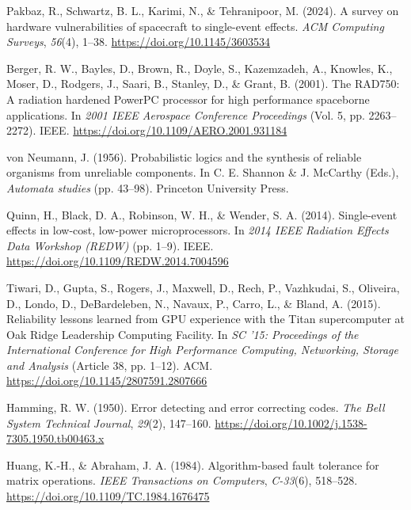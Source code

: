 \documentclass[12pt,a4paper]{article}
\theoremstyle{plain}
\theoremstyle{definition}
\begin{document}
\begin{enumerate}[label={[\arabic*]}, leftmargin=2em, itemsep=4pt]

\item Pakbaz, R., Schwartz, B. L., Karimi, N., \& Tehranipoor, M. (2024). A survey on hardware vulnerabilities of spacecraft to single-event effects. \textit{ACM Computing Surveys}, \textit{56}(4), 1--38. \url{https://doi.org/10.1145/3603534}

\item Berger, R. W., Bayles, D., Brown, R., Doyle, S., Kazemzadeh, A., Knowles, K., Moser, D., Rodgers, J., Saari, B., Stanley, D., \& Grant, B. (2001). The RAD750: A radiation hardened PowerPC processor for high performance spaceborne applications. In \textit{2001 IEEE Aerospace Conference Proceedings} (Vol. 5, pp. 2263--2272). IEEE. \url{https://doi.org/10.1109/AERO.2001.931184}

\item von Neumann, J. (1956). Probabilistic logics and the synthesis of reliable organisms from unreliable components. In C. E. Shannon \& J. McCarthy (Eds.), \textit{Automata studies} (pp. 43--98). Princeton University Press.

\item Quinn, H., Black, D. A., Robinson, W. H., \& Wender, S. A. (2014). Single-event effects in low-cost, low-power microprocessors. In \textit{2014 IEEE Radiation Effects Data Workshop (REDW)} (pp. 1--9). IEEE. \url{https://doi.org/10.1109/REDW.2014.7004596}

\item Tiwari, D., Gupta, S., Rogers, J., Maxwell, D., Rech, P., Vazhkudai, S., Oliveira, D., Londo, D., DeBardeleben, N., Navaux, P., Carro, L., \& Bland, A. (2015). Reliability lessons learned from GPU experience with the Titan supercomputer at Oak Ridge Leadership Computing Facility. In \textit{SC '15: Proceedings of the International Conference for High Performance Computing, Networking, Storage and Analysis} (Article 38, pp. 1--12). ACM. \url{https://doi.org/10.1145/2807591.2807666}

\item Hamming, R. W. (1950). Error detecting and error correcting codes. \textit{The Bell System Technical Journal}, \textit{29}(2), 147--160. \url{https://doi.org/10.1002/j.1538-7305.1950.tb00463.x}

\item Huang, K.-H., \& Abraham, J. A. (1984). Algorithm-based fault tolerance for matrix operations. \textit{IEEE Transactions on Computers}, \textit{C-33}(6), 518--528. \url{https://doi.org/10.1109/TC.1984.1676475}


\end{enumerate}
\end{document}
